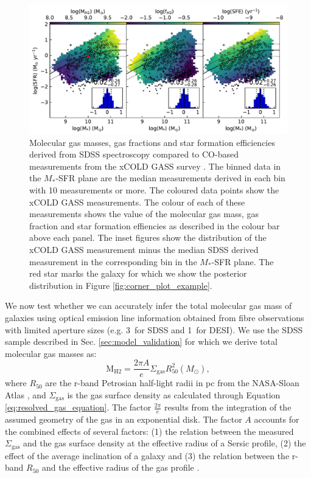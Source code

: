 \documentclass[fleqn,usenatbib]{mnras}
\begin{document}
\begin{figure}
    \centering
    \includegraphics[width=\textwidth]{figures/fig10.pdf}
    \caption{Molecular gas masses, gas fractions and star formation efficiencies derived from SDSS spectroscopy compared to CO-based measurements from the xCOLD GASS survey \citep{saintonge2017}. The binned data in the $M_{*}$-SFR plane are the median measurements derived in each bin with 10 measurements or more. The coloured data points show the xCOLD GASS measurements. The colour of each of these measurements shows the value of the molecular gas mass, gas fraction and star formation effiencies as described in the colour bar above each panel. The inset figures show the distribution of the xCOLD GASS measurement minus the median SDSS derived measurement in the corresponding bin in the $M_{*}$-SFR plane. The red star marks the galaxy for which we show the posterior distribution in Figure \ref{fig:corner_plot_example}.}
    \label{fig:MH2_FH2_SFE_comparison_xCOLDGASS}
\end{figure}

We now test whether we can accurately infer the total molecular gas mass of galaxies using optical emission line information obtained from fibre observations with limited aperture sizes (e.g. 3\arcsec\ for SDSS and 1\arcsec\ for DESI). We use the SDSS sample described in Sec. \ref{sec:model_validation} for which we derive total molecular gas masses as:
\begin{equation}
    \label{eq:gas_surface_density_to_mass}
    \textrm{M}_{\textrm{H2}} = \frac{2\pi A}{e} \Sigma_{\textrm{gas}} R_{50}^{2} (M_{\odot}), 
\end{equation}
where $R_{50}$ are the r-band Petrosian half-light radii in pc from the NASA-Sloan Atlas \citep{blanton2011}, and $\Sigma_{\textrm{gas}}$ is the gas surface density as calculated through Equation \ref{eq:resolved_gas_equation}. The factor $\frac{2\pi}{e}$ results from the integration of the assumed geometry of the gas in an exponential disk. The factor $A$ accounts for the combined effects of several factors: (1) the relation between the measured $\Sigma_{\textrm{gas}}$ and the gas surface density at the effective radius of a Sersic profile, (2) the effect of the average inclination of a galaxy and (3) the relation between the r-band $R_{50}$ and the effective radius of the gas profile \citep{casasola2017}. 
\end{document}
